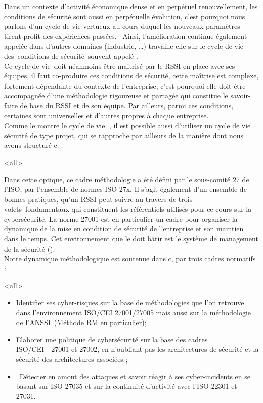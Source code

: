 Dans un contexte d'activité économique dense et en perpétuel renouvellement, les conditions de sécurité sont aussi en perpétuelle évolution, c’est pourquoi nous parlons d'un cycle de vie vertueux au cours duquel les nouveaux paramètres tirent profit des expériences passées.  Ainsi, l’amélioration continue également appelée  dans d’autres domaines (industrie, …) travaille elle sur le cycle de vie des conditions de sécurité souvent appelé .\\
Ce cycle de vie doit néanmoins être maitrisé par le RSSI en place avec ses équipes, il faut co-produire ces conditions de sécurité, cette maîtrise est complexe, fortement dépendante du contexte de l'entreprise, c’est pourquoi elle doit être accompagnée d'une méthodologie rigoureuse et partagée qui constitue le savoir-faire de base du RSSI et de son équipe. Par ailleurs, parmi ces conditions, certaines sont universelles et d’autres propres à chaque entreprise. \\ Comme le montre le cycle de vie. , il est possible aussi d’utiliser un cycle de vie sécurité de type projet, qui se rapproche par ailleurs de la manière dont nous avons structuré c\edoc. 

\mode<all>{}


Dans cette optique, ce cadre méthodologie a été défini par le sous-comité 27 de l'ISO, par l'ensemble de normes ISO 27x. Il s’agit également d'un ensemble de bonnes pratiques, qu'un RSSI peut suivre au travers de trois volets fondamentaux qui constituent les référentiels utilisés pour ce cours sur la cybersécurité. La norme 27001 est en particulier un cadre pour organiser la dynamique de la mise en condition de sécurité de l’entreprise et son maintien dans le temps. Cet environnement que le  doit bâtir est le système de management de la sécurité ().\\
Notre dynamique méthodologique est soutenue dans  c\edoc, par trois cadres normatifs : 
 
\mode<all>{
{
\begin{itemize}
\item Identifier ses cyber-risques sur la base de méthodologies que l’on retrouve dans l’environnement ISO/CEI 27001/27005 mais aussi sur la méthodologie  de l’ANSSI (Méthode  RM en particulier); 
\item Elaborer une politique de cybersécurité sur la base des cadres ISO/CEI  27001 et 27002, en n’oubliant pas les architectures de sécurité et la sécurité des architectures associées ; 
\item Détecter en amont des attaques et savoir réagir à ses cyber-incidents en se basant sur ISO 27035 et sur la continuité d’activité avec l’ISO 22301 et 27031.
\end{itemize}
}} %


